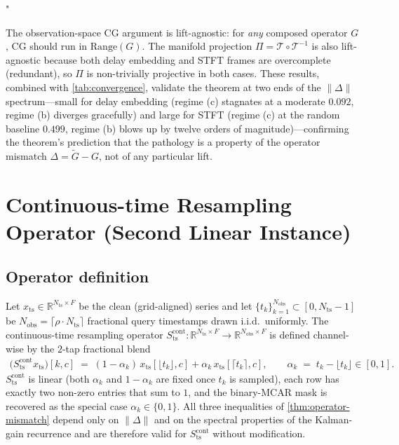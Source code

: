 "\documentclass{article}
\theoremstyle{plain}
\theoremstyle{definition}
\theoremstyle{remark}
\newcommand{\tsimg}{\mathcal{T}}
\newcommand{\imgts}{\mathcal{T}^{-1}}
\newcommand{\Nts}{N_{\mathrm{ts}}}
\newcommand{\Nobs}{N_{\mathrm{obs}}}
\newcommand{\xts}{x_{\mathrm{ts}}}
\begin{document}
The observation-space CG argument is lift-agnostic: for \emph{any} composed operator $G$, CG should run in $\mathrm{Range}(G)$. The manifold projection $\Pi = \tsimg \circ \imgts$ is also lift-agnostic because both delay embedding and STFT frames are overcomplete (redundant), so $\Pi$ is non-trivially projective in both cases. These results, combined with \cref{tab:convergence}, validate the theorem at two ends of the $\|\Delta\|$ spectrum---small for delay embedding (regime (c) stagnates at a moderate $0.092$, regime (b) diverges gracefully) and large for STFT (regime (c) at the random baseline $0.499$, regime (b) blows up by twelve orders of magnitude)---confirming the theorem's prediction that the pathology is a property of the operator mismatch $\Delta = \tilde{G} - G$, not of any particular lift.

\section{Continuous-time Resampling Operator (Second Linear Instance)}
\label{app:continuous}

\subsection{Operator definition}
\label{app:continuous-def}

Let $\xts \in \mathbb{R}^{\Nts \times F}$ be the clean (grid-aligned) series and let $\{t_k\}_{k=1}^{\Nobs} \subset [0, \Nts - 1]$ be $\Nobs = \lceil \rho \cdot \Nts \rceil$ fractional query timestamps drawn i.i.d.\ uniformly. The continuous-time resampling operator $S_{\mathrm{ts}}^{\mathrm{cont}} : \mathbb{R}^{\Nts \times F} \to \mathbb{R}^{\Nobs \times F}$ is defined channel-wise by the $2$-tap fractional blend
\begin{align}
\bigl(S_{\mathrm{ts}}^{\mathrm{cont}} \xts\bigr)[k, c]
\;=\; (1 - \alpha_k)\,\xts[\lfloor t_k \rfloor, c] + \alpha_k\,\xts[\lceil t_k \rceil, c],
\qquad \alpha_k \;=\; t_k - \lfloor t_k \rfloor \in [0, 1].
\label{eq:continuous-op}
\end{align}
$S_{\mathrm{ts}}^{\mathrm{cont}}$ is linear (both $\alpha_k$ and $1-\alpha_k$ are fixed once $t_k$ is sampled), each row has exactly two non-zero entries that sum to $1$, and the binary-MCAR mask is recovered as the special case $\alpha_k \in \{0, 1\}$. All three inequalities of \cref{thm:operator-mismatch} depend only on $\|\Delta\|$ and on the spectral properties of the Kalman-gain recurrence and are therefore valid for $S_{\mathrm{ts}}^{\mathrm{cont}}$ without modification.
\end{document}
